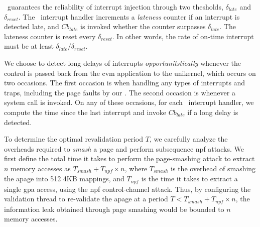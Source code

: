 \veriint\ guarantees the reliability of interrupt injection through two thesholds, $\delta_{late}$ and $\delta_{reset}$.
The \veriint\ interrupt handler increments a \emph{lateness} counter if an interrupt is detected late, and $Cb_{late}$ is invoked whether the counter surpasses $\delta_{late}$.
The lateness counter is reset every $\delta_{reset}$.
In other words, the rate of on-time interrupt must be at least $\delta_{late}/\delta_{reset}$.

\begin{algorithm}[h]
	\small
	\caption{Time-verified interrupt handler}
\end{algorithm}



We choose to detect long delays of interrupts \emph{opportunitstically} whenever the control is passed back from the \gls{cvm} application to the unikernel, which occurs on two occasions.
The first occasion is when handling any types of interrupts and traps, including the page faults by our \thename.
The second occasion is whenever a system call is invoked.
On any of these occasions, for each \veriint\ interrupt handler, we compute the time since the last interrupt and invoke $Cb_{late}$ if a long delay is detected.



To determine the optimal revalidation period $T$, we carefully analyze the overheads required to \emph{smash} a page and perform subsequence \gls{npf} attacks.
We first define the total time it takes to perform the page-smashing attack to extract $n$ memory accesses as  $T_{smash} + T_{npf} \times n$, where $T_{smash}$ is the overhead of smashing the \gls{apage} into 512 4KB mappings, and $T_{npf}$ is the time it takes to extract a single \gls{gpa} access, using the \gls{npf} control-channel attack.
Thus, by configuring the validation thread to re-validate the \gls{apage} at a period $T < T_{smash} + T_{npf} \times n$, the information leak obtained through page smashing would be bounded to $n$ memory accesses.




